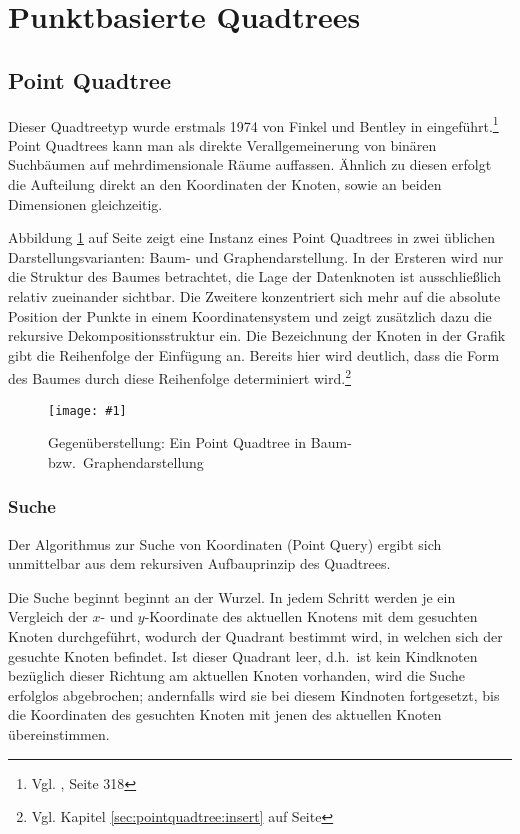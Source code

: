 \documentclass[%
			paper=a4,%
			DIV12,
			liststotoc,
			bibtotoc,
			draft=false,%
			titlepage
			]{scrartcl}
\newcommand{\zit}[3]{#1 \cite{#2}, #3}
\newcommand{\footzit}[3]{\footnote{\zit{#1}{#2}{#3}}}
\newcommand{\myfig}[5] {
 \begin{figure}[tbph]
	 \centering
	 \texttt{[image: \#1]}
	 \caption[#4]{#5}
	 \label{fig:#2}
 \end{figure}
}
\begin{document}
\section{Punktbasierte Quadtrees}
\label{sec:pointbased}
\subsection{Point Quadtree}
Dieser Quadtreetyp wurde erstmals 1974 von Finkel und Bentley in \cite{DBLP:journals/acta/FinkelB74} eingeführt.\footzit{Vgl.}{compgeom:2000}{Seite 318}
Point Quadtrees kann man als direkte Verallgemeinerung von binären Suchbäumen auf mehrdimensionale Räume auffassen. 
Ähnlich zu diesen erfolgt die Aufteilung direkt an den Koordinaten der Knoten, sowie an beiden Dimensionen gleichzeitig. 


Abbildung \ref{fig:pointquadtree} auf Seite \pageref{fig:pointquadtree} zeigt eine Instanz eines Point Quadtrees in zwei üblichen Darstellungsvarianten: Baum- und Graphendarstellung.
In der Ersteren wird nur die Struktur des Baumes betrachtet, die Lage der Datenknoten ist ausschließlich relativ zueinander sichtbar.
Die Zweitere konzentriert sich mehr auf die absolute Position der Punkte in einem Koordinatensystem und zeigt zusätzlich dazu die rekursive Dekompositionsstruktur ein.
Die Bezeichnung der Knoten in der Grafik gibt die Reihenfolge der Einfügung an. Bereits hier wird deutlich, dass die Form des Baumes durch diese Reihenfolge determiniert wird.\footnote{Vgl. Kapitel \ref{sec:pointquadtree:insert} auf Seite \pageref{sec:pointquadtree:insert}}
\myfig{img/pointquadtree-ins7+tree-trimmed}{pointquadtree}{width=.9\textwidth}{Point Quadtreee}{Gegenüberstellung: Ein Point Quadtree in Baum- bzw.\ Graphendarstellung}

\subsubsection{Suche}
\label{sec:pointquadtree-suche}
Der Algorithmus zur Suche von Koordinaten (Point Query) ergibt sich unmittelbar aus dem rekursiven Aufbauprinzip des Quadtrees. 

Die Suche beginnt beginnt an der Wurzel. In jedem Schritt werden je ein Vergleich der $x$- und $y$-Koordinate des aktuellen Knotens mit dem gesuchten Knoten durchgeführt, wodurch der Quadrant bestimmt wird, in welchen sich der gesuchte Knoten befindet. Ist dieser Quadrant leer, d.h.\ ist kein Kindknoten bezüglich dieser Richtung am aktuellen Knoten vorhanden, wird die Suche erfolglos abgebrochen; andernfalls wird sie bei diesem Kindnoten fortgesetzt, bis die Koordinaten des gesuchten Knoten mit jenen des aktuellen Knoten übereinstimmen.
\end{document}
